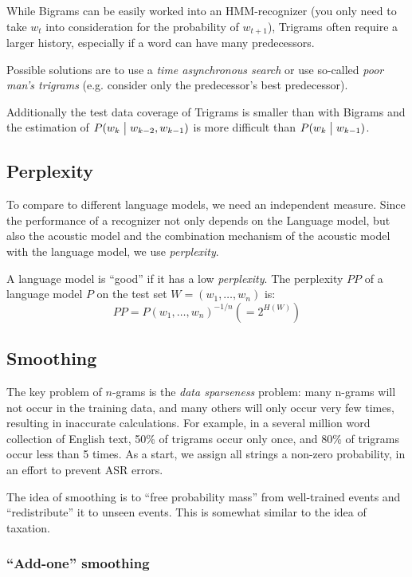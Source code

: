 While Bigrams can be easily worked into an HMM-recognizer (you only need to take $w_t$ into consideration for the probability of $w_{t+1}$), Trigrams often require a larger history, especially if a word can have many predecessors.

Possible solutions are to use a \emph{time asynchronous search} or use so-called \emph{poor man's trigrams} (e.g. consider only the predecessor's best predecessor).

Additionally the test data coverage of Trigrams is smaller than with Bigrams and the estimation of  $P(w_k \bigm| w_{k - 2}, w_{k-1})$ is more difficult than $P(w_k \bigm|  w_{k-1})$.

\subsection{Perplexity}

To compare to different language models, we need an independent measure. Since the performance of a recognizer not only depends on the Language model, but also the acoustic model and the combination mechanism of the acoustic model with the language model, we use \emph{perplexity}.

A language model is ``good'' if it has a low \textit{perplexity}. The perplexity $PP$ of a language model $P$ on the test set $W = (w_1, \ldots, w_n)$ is:
\[
    PP = P(w_1, \ldots, w_n)^{-1/n} ( = 2^{H(W)})
\]

\subsection{Smoothing}

The key problem of $n$-grams is the \textit{data sparseness} problem: many n-grams will not occur in the training data, and many others will only occur very few times, resulting in inaccurate calculations. For example, in a several million word collection of English text, 50\% of trigrams occur only once, and 80\% of trigrams occur less than 5 times. As a start, we assign all strings a non-zero probability, in an effort to prevent ASR errors.

The idea of smoothing is to ``free probability mass'' from well-trained events and ``redistribute'' it to unseen events. This is somewhat similar to the idea of taxation.

\subsubsection{``Add-one'' smoothing}

